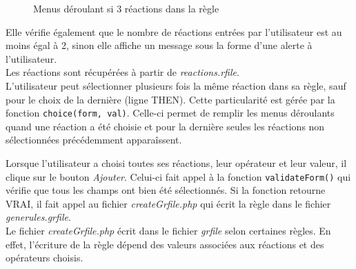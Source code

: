 \begin{figure}[!ht]
	\begin{center}
		\caption{Menus déroulant si 3 réactions dans la règle}
  		\label{menusDeroulants2}
  	\end{center}	
\end{figure}

Elle vérifie également que le nombre de réactions entrées par l'utilisateur est au moins égal à 2, sinon elle affiche un message sous la forme d'une alerte à l'utilisateur.\\
Les réactions sont récupérées à partir de \emph{reactions.rfile}.\\

L'utilisateur peut sélectionner plusieurs fois la m\^eme réaction dans sa règle, sauf pour le choix de la dernière (ligne THEN). Cette particularité est gérée par la fonction \texttt{choice(form, val)}. Celle-ci permet de remplir les menus déroulants quand une réaction a été choisie et pour la dernière seules les réactions non sélectionnées précédemment appara\^issent.

Lorsque l'utilisateur a choisi toutes ses réactions, leur opérateur et leur valeur, il clique sur le bouton \emph{Ajouter}. Celui-ci fait appel à la fonction \texttt{validateForm()} qui vérifie que tous les champs ont bien été sélectionnés. Si la fonction retourne VRAI, il fait appel au fichier \emph{createGrfile.php} qui écrit la règle dans le fichier \emph{generules.grfile}.\\
Le fichier \emph{createGrfile.php} écrit dans le fichier \emph{grfile} selon certaines règles. En effet, l'écriture de la règle dépend des valeurs associées aux réactions et des opérateurs choisis.\\

